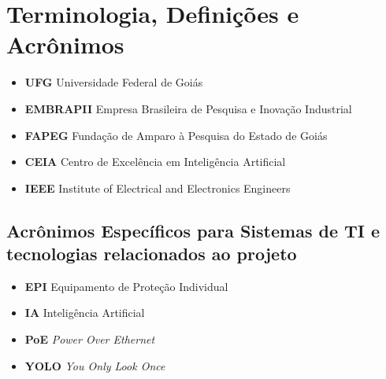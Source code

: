 \section*{Terminologia, Definições e Acrônimos}\label{sec:terminologias}

\begin{itemize}
    \item \textbf{UFG} Universidade Federal de Goiás
    \item \textbf{EMBRAPII} Empresa Brasileira de Pesquisa e Inovação Industrial
    \item \textbf{FAPEG} Fundação de Amparo à Pesquisa do Estado de Goiás
    \item \textbf{CEIA} Centro de Excelência em Inteligência Artificial
    \item \textbf{IEEE} Institute of Electrical and Electronics Engineers

\end{itemize}

\subsection*{Acrônimos Específicos para Sistemas de TI e tecnologias relacionados ao projeto}
\begin{itemize}
    \item \textbf{EPI} Equipamento de Proteção Individual
    \item \textbf{IA} Inteligência Artificial
    \item \textbf{PoE} \textit{Power Over Ethernet}
    \item \textbf{YOLO} \textit{You Only Look Once}
    
\end{itemize}